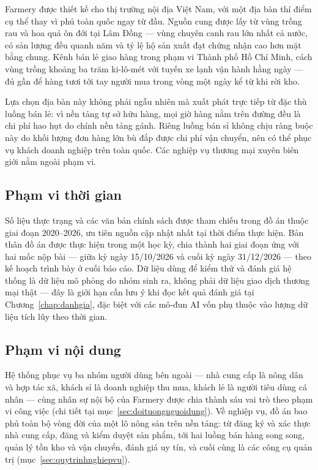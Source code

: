 Farmery được thiết kế cho thị trường nội địa Việt Nam, với một địa bàn thí điểm cụ thể thay vì phủ toàn quốc ngay từ đầu. Nguồn cung được lấy từ vùng trồng rau và hoa quả ôn đới tại Lâm Đồng --- vùng chuyên canh rau lớn nhất cả nước, có sản lượng đều quanh năm và tỷ lệ hộ sản xuất đạt chứng nhận cao hơn mặt bằng chung. Kênh bán lẻ giao hàng trong phạm vi Thành phố Hồ Chí Minh, cách vùng trồng khoảng ba trăm ki-lô-mét với tuyến xe lạnh vận hành hằng ngày --- đủ gần để hàng tươi tới tay người mua trong vòng một ngày kể từ khi rời kho.

Lựa chọn địa bàn này không phải ngẫu nhiên mà xuất phát trực tiếp từ đặc thù luồng bán lẻ: vì nền tảng tự sở hữu hàng, mọi giờ hàng nằm trên đường đều là chi phí hao hụt do chính nền tảng gánh. Riêng luồng bán sỉ không chịu ràng buộc này do khối lượng đơn hàng lớn bù đắp được chi phí vận chuyển, nên có thể phục vụ khách doanh nghiệp trên toàn quốc. Các nghiệp vụ thương mại xuyên biên giới nằm ngoài phạm vi.

\subsection{Phạm vi thời gian}

Số liệu thực trạng và các văn bản chính sách được tham chiếu trong đồ án thuộc giai đoạn 2020--2026, ưu tiên nguồn cập nhật nhất tại thời điểm thực hiện. Bản thân đồ án được thực hiện trong một học kỳ, chia thành hai giai đoạn ứng với hai mốc nộp bài --- giữa kỳ ngày 15/10/2026 và cuối kỳ ngày 31/12/2026 --- theo kế hoạch trình bày ở cuối báo cáo. Dữ liệu dùng để kiểm thử và đánh giá hệ thống là dữ liệu mô phỏng do nhóm sinh ra, không phải dữ liệu giao dịch thương mại thật --- đây là giới hạn cần lưu ý khi đọc kết quả đánh giá tại Chương~\ref{chap:danhgia}, đặc biệt với các mô-đun AI vốn phụ thuộc vào lượng dữ liệu tích lũy theo thời gian.

\subsection{Phạm vi nội dung}

Hệ thống phục vụ ba nhóm người dùng bên ngoài --- nhà cung cấp là nông dân và hợp tác xã, khách sỉ là doanh nghiệp thu mua, khách lẻ là người tiêu dùng cá nhân --- cùng nhân sự nội bộ của Farmery được chia thành sáu vai trò theo phạm vi công việc (chi tiết tại mục~\ref{sec:doituongnguoidung}). Về nghiệp vụ, đồ án bao phủ toàn bộ vòng đời của một lô nông sản trên nền tảng: từ đăng ký và xác thực nhà cung cấp, đăng và kiểm duyệt sản phẩm, tới hai luồng bán hàng song song, quản lý tồn kho và vận chuyển, đánh giá uy tín, và cuối cùng là các công cụ quản trị (mục~\ref{sec:quytrinhnghiepvu}).

